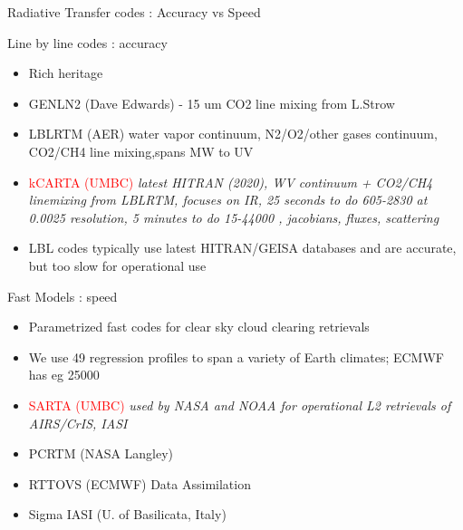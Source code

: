 \documentclass[10pt,t]{beamer}
\begin{document}
\begin{frame}[shrink=2]{Radiative Transfer codes : Accuracy vs Speed}
\begin{block}{Line by line codes : accuracy}
  \begin{itemize}
  \item Rich heritage
  \item GENLN2 (Dave Edwards) - 15 um CO2 line mixing from L.Strow
  \item LBLRTM (AER) water vapor continuum, N2/O2/other gases continuum, CO2/CH4 line mixing,spans MW to UV
  \item \textcolor{red}{kCARTA (UMBC)} \emph{latest HITRAN (2020), WV continuum + CO2/CH4 linemixing from LBLRTM, 
        focuses on IR, 25 seconds to do 605-2830 \wn at 0.0025 \wn resolution, 5 minutes to do 15-44000 \wn, jacobians, 
        fluxes, scattering}
  \item LBL codes typically use latest HITRAN/GEISA databases and are accurate, but too slow for operational use
  \end{itemize}
\end{block}

\begin{block}{Fast Models : speed}
  \begin{itemize}
  \item Parametrized fast codes for clear sky cloud clearing retrievals
  \item We use 49 regression profiles to span a variety of Earth climates; ECMWF has eg 25000
  \item \textcolor{red}{SARTA (UMBC)} \emph{used by NASA and NOAA for operational L2 retrievals of AIRS/CrIS, IASI}
  \item PCRTM (NASA Langley)
  \item RTTOVS (ECMWF) Data Assimilation
  \item Sigma IASI (U. of Basilicata, Italy) 
  \end{itemize}
\end{block}
\end{frame}
\end{document}
